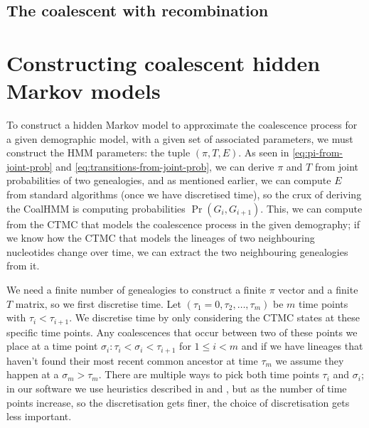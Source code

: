 \documentclass[graybox]{svmult}
\newcommand{\T}{\ensuremath{T}}
\renewcommand{\E}{\ensuremath{E}}
\begin{document}
\subsection{The coalescent with recombination}





\section{Constructing coalescent hidden Markov models}


To construct a hidden Markov model to approximate the coalescence process for a given demographic model, with a given set of associated parameters, we must construct the HMM parameters: the tuple $(\pi,\T,\E)$. As seen in \eqref{eq:pi-from-joint-prob} and \eqref{eq:transitions-from-joint-prob}, we can derive $\pi$ and $\T$ from joint probabilities of two genealogies, and as mentioned earlier, we can compute $\E$ from standard algorithms (once we have discretised time), so the crux of deriving the CoalHMM is computing probabilities $\Pr(G_i,G_{i+1})$. This, we can compute from the CTMC that models the coalescence process in the given demography; if we know how the CTMC that models the lineages of two neighbouring nucleotides change over time, we can extract the two neighbouring genealogies from it.

We need a finite number of genealogies to construct a finite $\pi$ vector and a finite $\T$ matrix, so we first discretise time. Let $(\tau_1=0,\tau_2,\ldots,\tau_m)$ be $m$ time points with $\tau_i<\tau_{i+1}$. We discretise time by only considering the CTMC states at these specific time points. Any coalescences that occur between two of these points we place at a time point $\sigma_i: \tau_i < \sigma_i < \tau_{i+1}$ for $1 \leq i < m$ and if we have lineages that haven't found their most recent common ancestor at time $\tau_{m}$ we assume they happen at a $\sigma_m > \tau_m$. There are multiple ways to pick both time points $\tau_i$ and $\sigma_i$; in our software we use heuristics described in \citet{Mailund:2011dva} and \cite{Mailund:2012ewa}, but as the number of time points increase, so the discretisation gets finer, the choice of discretisation gets less important.
\end{document}
